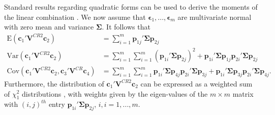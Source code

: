 \documentclass[12pt]{article}\usepackage[]{graphicx}\usepackage[]{color}
\newcommand{\E}{\text{E}}
\newcommand{\Cov}{\text{Cov}}
\newcommand{\Var}{\text{Var}}
\newcommand{\bm}{\mathbf}
\newcommand{\bs}{\boldsymbol}
\begin{document}
Standard results regarding quadratic forms can be used to derive the moments of the linear combination \citep[e.g.,][Sec. 13.5]{Searle2006matrix}. We now assume that $\bs\epsilon_1,...,\bs\epsilon_m$ are multivariate normal with zero mean and variance $\bs\Sigma$. It follows that 
\begin{align}
\label{eq:CRVE_expectation}
\E\left(\bm{c}_1' \bm{V}^{CR2} \bm{c}_2\right) &= \sum_{i=1}^m \bm{p}_{1j}' \bs\Sigma \bm{p}_{2j} \\
\label{eq:CRVE_variance}
\Var\left(\bm{c}_1' \bm{V}^{CR2} \bm{c}_2\right) &= \sum_{i=1}^m \sum_{i=1}^m \left(\bm{p}_{1i}' \bs\Sigma \bm{p}_{2j}\right)^2 + \bm{p}_{1i}' \bs\Sigma \bm{p}_{1j} \bm{p}_{2i}' \bs\Sigma \bm{p}_{2j} \\
\label{eq:CRVE_covariance}
\Cov\left(\bm{c}_1' \bm{V}^{CR2} \bm{c}_2, \bm{c}_3' \bm{V}^{CR} \bm{c}_4\right) &= \sum_{i=1}^m \sum_{i=1}^m \bm{p}_{1i}' \bs\Sigma \bm{p}_{4j} \bm{p}_{2i}' \bs\Sigma \bm{p}_{3j} + \bm{p}_{1i}' \bs\Sigma \bm{p}_{3j} \bm{p}_{2i}' \bs\Sigma \bm{p}_{4j}.
\end{align}
Furthermore, the distribution of $\bm{c}_1' \bm{V}^{CR2} \bm{c}_2$ can be expressed as a weighted sum of $\chi^2_1$ distributions \citep{mathai1992quadratic}, with weights given by the eigen-values of the $m \times m$ matrix with $\left(i,j\right)^{th}$ entry $\bm{p}_{1i}' \bs\Sigma \bm{p}_{2j}$, $i,i=1,...,m$.



\end{document}
